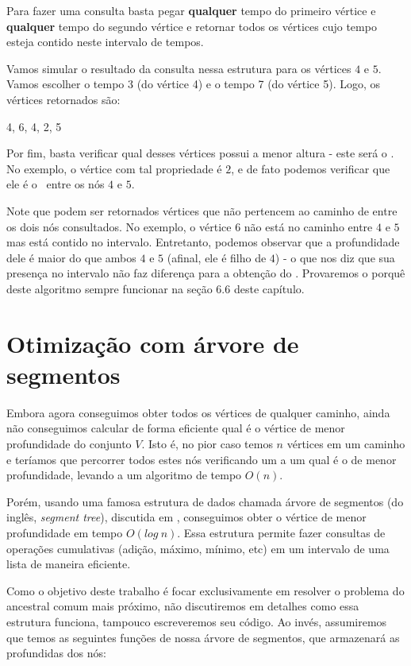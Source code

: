 Para fazer uma consulta basta pegar \textbf{qualquer} tempo do primeiro vértice e \textbf{qualquer} tempo do segundo vértice e retornar todos os vértices cujo tempo esteja contido neste intervalo de tempos.

Vamos simular o resultado da consulta nessa estrutura para os vértices $4$ e $5$. Vamos escolher o tempo 3 (do vértice 4) e o tempo 7 (do vértice 5). Logo, os vértices retornados são:



\begin{center}
    4, 6, 4, 2, 5    
\end{center}

Por fim, basta verificar qual desses vértices possui a menor altura - este será o \LCA. No exemplo, o vértice com tal propriedade é $2$, e de fato podemos verificar que ele é o \LCA\ entre os nós $4$ e $5$.

Note que podem ser retornados vértices que não pertencem ao caminho de entre os dois nós consultados. No exemplo, o vértice $6$ não está no caminho entre $4$ e $5$ mas está contido no intervalo. Entretanto, podemos observar que a profundidade dele é maior do que ambos $4$ e $5$ (afinal, ele é filho de $4$) - o que nos diz que sua presença no intervalo não faz diferença para a obtenção do \LCA. Provaremos o porquê deste algoritmo sempre funcionar na seção 6.6 deste capítulo.

\section{Otimização com árvore de segmentos}

Embora agora conseguimos obter todos os vértices de qualquer caminho, ainda não conseguimos calcular de forma eficiente qual é o vértice de menor profundidade do conjunto $V$. Isto é, no pior caso temos $n$ vértices em um caminho e teríamos que percorrer todos estes nós verificando um a um qual é o de menor profundidade, levando a um algoritmo de tempo $O(n)$.

Porém, usando uma famosa estrutura de dados chamada árvore de segmentos (do inglês, \textit{segment tree}), discutida em \cite{arvore-segmentos}, conseguimos obter o vértice de menor profundidade em tempo $O(log\ n)$. Essa estrutura permite fazer consultas de operações cumulativas (adição, máximo, mínimo, etc) em um intervalo de uma lista de maneira eficiente.

Como o objetivo deste trabalho é focar exclusivamente em resolver o problema do ancestral comum mais próximo, não discutiremos em detalhes como essa estrutura funciona, tampouco escreveremos seu código. Ao invés, assumiremos que temos as seguintes funções de nossa árvore de segmentos, que armazenará as profundidas dos nós:

